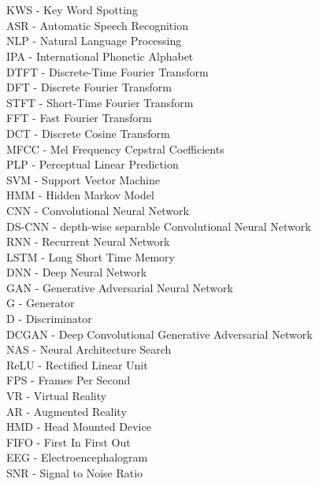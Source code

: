 
\chapter*{}
KWS - Key Word Spotting\\
ASR - Automatic Speech Recognition\\
NLP - Natural Language Processing\\
IPA - International Phonetic Alphabet\\
%
DTFT - Discrete-Time Fourier Transform\\
DFT - Discrete Fourier Transform\\
STFT - Short-Time Fourier Transform\\
FFT - Fast Fourier Transform\\
DCT - Discrete Cosine Transform\\
MFCC - Mel Frequency Cepstral Coefficients\\
PLP - Perceptual Linear Prediction\\
%
SVM - Support Vector Machine\\
HMM - Hidden Markov Model\\
%
CNN - Convolutional Neural Network\\
DS-CNN - depth-wise separable Convolutional Neural Network\\
RNN - Recurrent Neural Network\\
LSTM - Long Short Time Memory\\
DNN - Deep Neural Network\\
GAN - Generative Adversarial Neural Network\\
G - Generator\\
D - Discriminator\\
DCGAN - Deep Convolutional Generative Adversarial Network\\
NAS - Neural Architecture Search\\
ReLU - Rectified Linear Unit\\
%
FPS - Frames Per Second\\
VR - Virtual Reality\\
AR - Augmented Reality\\
HMD - Head Mounted Device\\
%
FIFO - First In First Out\\
%
EEG - Electroencephalogram\\
SNR - Signal to Noise Ratio\\